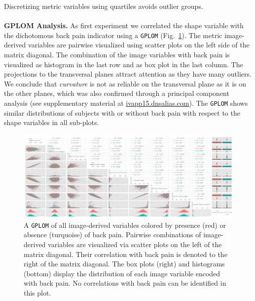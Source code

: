 \documentclass[a4paper,twoside]{style/article}
\begin{document}
Discretizing metric variables using quartiles avoids outlier groups.
\\\\
\noindent \textbf{GPLOM Analysis.}
As first experiment we correlated the shape variable with the dichotomous back pain indicator using a \texttt{GPLOM} (Fig.~\ref{fig:image-parameter-range}).
The metric image-derived variables are pairwise visualized using scatter plots on the left side of the matrix diagonal.
The combination of the image variables with back pain is visualized as histogram in the last row and as box plot in the last column.
The projections to the transversal planes attract attention as they have many outliers.
We conclude that \emph{curvature} is not as reliable on the transversal plane as it is on the other planes, which was also confirmed through a principal component analysis (see supplementary material at \url{ivapp15.dnsalias.com}).
The \texttt{GPLOM} shows similar distributions of subjects with or without back pain with respect to the shape variables in all sub-plots.
\begin{figure}[htb]
  \centering
  \includegraphics[width=1.0\textwidth]{figures/image-parameter-range}
  \caption{
A \texttt{GPLOM} of all image-derived variables colored by presence (red) or absence (turquoise) of back pain.
Pairwise combinations of image-derived variables are visualized via scatter plots on the left of the matrix diagonal.
Their correlation with back pain is denoted to the right of the matrix diagonal.
The box plots (right) and histograms (bottom) display the distribution of each image variable encoded with back pain.
No correlations with back pain can be identified in this plot.
}
  \label{fig:image-parameter-range}
\end{figure}
\end{document}
